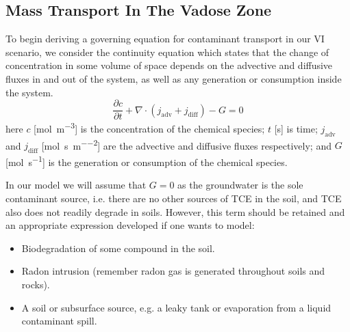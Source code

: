 \subsection{Mass Transport In The Vadose Zone}\label{sec:transport}

To begin deriving a governing equation for contaminant transport in our VI scenario, we consider the continuity equation which states that the change of concentration in some volume of space depends on the advective and diffusive fluxes in and out of the system, as well as any generation or consumption inside the system.
\begin{equation}
  \frac{\partial c}{\partial t} + \nabla \cdot(j_\mathrm{adv} + j_\mathrm{diff}) - G = 0
\end{equation}
here $c$ [\si{\mol\per\metre\cubed}] is the concentration of the chemical species;
$t$ [\si{\second}] is time;
$j_\mathrm{adv}$ and $j_\mathrm{diff}$ [\si{\mol\per\second\per\metre\squared}] are the advective and diffusive fluxes respectively;
and $G$ [\si{\mol\per\second}] is the generation or consumption of the chemical species.\par

In our model we will assume that $G = 0$ as the groundwater is the sole contaminant source, i.e. there are no other sources of TCE in the soil, and TCE also does not readily degrade in soils. %
However, this term should be retained and an appropriate expression developed if one wants to model:
\begin{itemize}
  \item Biodegradation of some compound in the soil.
  \item Radon intrusion (remember radon gas is generated throughout soils and rocks).
  \item A soil or subsurface source, e.g. a leaky tank or evaporation from a liquid contaminant spill.
\end{itemize}\par

